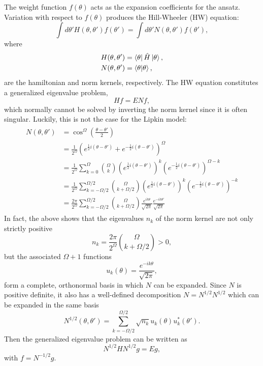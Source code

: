 \documentclass[prb,aps,twocolumn,showpacs,10pt]{revtex4-2}
\begin{document}
The weight function $f(\theta)$ acts as the expansion coefficients for the ansatz. Variation with respect to $f(\theta)$ produces the Hill-Wheeler (HW) equation:
\begin{equation}
\int d\theta' H(\theta, \theta') f(\theta') = \int d \theta' N(\theta, \theta') f(\theta'),
\end{equation}
where 
\begin{align}
H(\theta, \theta') &= \bra{\theta} \hat{H} \ket{\theta}, \\
N(\theta, \theta') &= \bra{\theta}\ket{\theta},
\end{align}
are the hamiltonian and norm kernels, respectively. The HW equation constitutes a generalized eigenvalue problem,
\begin{equation}
Hf = ENf,
\end{equation}
which normally cannot be solved by inverting the norm kernel since it is often singular. Luckily, this is not the case for the Lipkin model:
\begin{align}
\begin{split}
N(\theta, \theta') &= \cos^\Omega \left( \frac{\theta-\theta'}{2} \right)\\
&= \frac{1}{2^\Omega} \left( e^{\frac{1}{2}i(\theta-\theta')} + e^{-\frac{1}{2}i(\theta-\theta')}  \right)^\Omega\\
&= \frac{1}{2^\Omega}  \sum_{k = 0}^\Omega {\Omega\choose k} \left( e^{\frac{1}{2}i(\theta-\theta')} \right)^k \left( e^{-\frac{1}{2}i(\theta-\theta')} \right)^{\Omega-k}\\
&= \frac{1}{2^\Omega}  \sum_{k = -\Omega/2}^{\Omega/2} {\Omega\choose k+\Omega/2} \left( e^{\frac{1}{2}i(\theta-\theta')} \right)^{k} \left( e^{-\frac{1}{2}i(\theta-\theta')} \right)^{-k} \\
&= \frac{2\pi}{2^\Omega}  \sum_{k = -\Omega/2}^{\Omega/2} {\Omega\choose k+\Omega/2} \frac{e^{ik\theta}}{\sqrt{2\pi}} \frac{e^{-ik\theta'}}{\sqrt{2\pi}}
\end{split}
\end{align}
In fact, the above shows that the eigenvalues $n_k$ of the norm kernel are not only strictly positive
\begin{equation}
n_k = \frac{2\pi}{2^\Omega} {\Omega\choose k+\Omega/2} > 0,
\end{equation}
but the associated $\Omega+1$ functions
\begin{equation}
u_k(\theta) = \frac{e^{-ik\theta}}{\sqrt{2\pi}},
\end{equation}
form a complete, orthonormal basis in which $N$ can be expanded. Since $N$ is positive definite, it also has a well-defined decomposition $N=N^{1/2} N^{1/2}$ which can be expanded in the same basis
\begin{equation}
N^{1/2}(\theta, \theta')= \sum_{k = -\Omega/2}^{\Omega/2} \sqrt{n_k} u_k(\theta) u_k^* (\theta').
\end{equation}
Then the generalized eigenvalue problem can be written as
\begin{equation}
N^{1/2} H N^{1/2} g = E g,
\end{equation}
with $f = N^{-1/2}g$.
\end{document}
